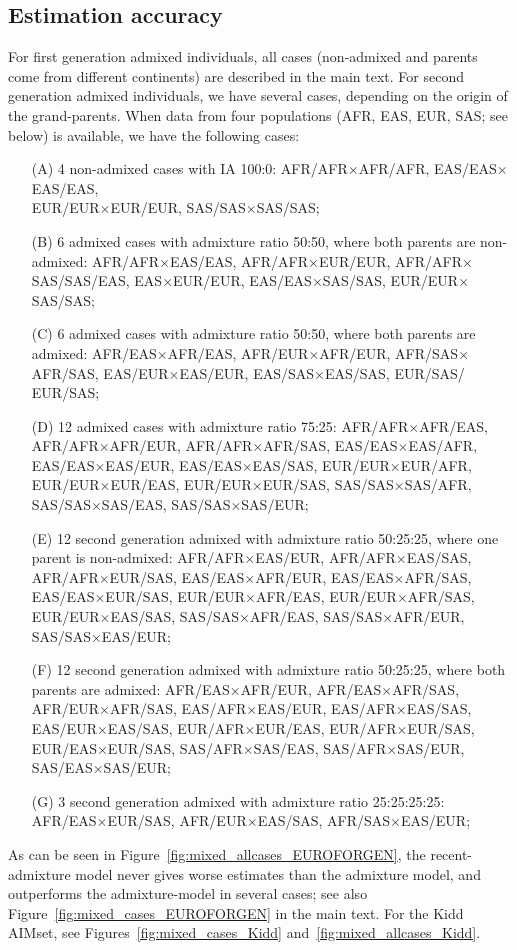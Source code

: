 \documentclass[12pt]{article}
\theoremstyle{definition}
\begin{document}
\newpage

\subsection{Estimation accuracy}
For first generation admixed individuals, all cases (non-admixed and
parents come from different continents) are described in the main
text. For second generation admixed individuals, we have several
cases, depending on the origin of the grand-parents.  When data from
four populations (AFR, EAS, EUR, SAS; see below) is available, we have
the following cases:
\begin{itemize}
\item[(A)] 4 non-admixed cases with IA 100:0: AFR/AFR$\times$AFR/AFR,
  EAS/EAS$\times$EAS/EAS, \\ EUR/EUR$\times$EUR/EUR,
  SAS/SAS$\times$SAS/SAS;
\item[(B)] 6 admixed cases with admixture ratio 50:50, where both
  parents are non-admixed: AFR/AFR$\times$EAS/EAS,
  AFR/AFR$\times$EUR/EUR, AFR/AFR$\times$SAS/SAS/EAS,
  EAS$\times$EUR/EUR, EAS/EAS$\times$SAS/SAS, EUR/EUR$\times$SAS/SAS;
\item[(C)] 6 admixed cases with admixture ratio 50:50, where both
  parents are admixed: AFR/EAS$\times$AFR/EAS, AFR/EUR$\times$AFR/EUR,
  AFR/SAS$\times$AFR/SAS, EAS/EUR$\times$EAS/EUR,
  EAS/SAS$\times$EAS/SAS, EUR/SAS/ EUR/SAS;
\item[(D)] 12 admixed cases with admixture ratio 75:25:
  AFR/AFR$\times$AFR/EAS, AFR/AFR$\times$AFR/EUR,
  AFR/AFR$\times$AFR/SAS, EAS/EAS$\times$EAS/AFR,
  EAS/EAS$\times$EAS/EUR, EAS/EAS$\times$EAS/SAS,
  EUR/EUR$\times$EUR/AFR, EUR/EUR$\times$EUR/EAS,
  EUR/EUR$\times$EUR/SAS, SAS/SAS$\times$SAS/AFR,
  SAS/SAS$\times$SAS/EAS, SAS/SAS$\times$SAS/EUR;
\item[(E)] 12 second generation admixed with admixture ratio 50:25:25,
  where one parent is non-admixed: AFR/AFR$\times$EAS/EUR,
  AFR/AFR$\times$EAS/SAS, AFR/AFR$\times$EUR/SAS,
  EAS/EAS$\times$AFR/EUR, EAS/EAS$\times$AFR/SAS,
  EAS/EAS$\times$EUR/SAS, EUR/EUR$\times$AFR/EAS,
  EUR/EUR$\times$AFR/SAS, EUR/EUR$\times$EAS/SAS,
  SAS/SAS$\times$AFR/EAS, SAS/SAS$\times$AFR/EUR,
  SAS/SAS$\times$EAS/EUR;
\item[(F)] 12 second generation admixed with admixture ratio 50:25:25,
  where both parents are admixed: AFR/EAS$\times$AFR/EUR,
  AFR/EAS$\times$AFR/SAS, AFR/EUR$\times$AFR/SAS,
  EAS/AFR$\times$EAS/EUR, EAS/AFR$\times$EAS/SAS,
  EAS/EUR$\times$EAS/SAS, EUR/AFR$\times$EUR/EAS,
  EUR/AFR$\times$EUR/SAS, EUR/EAS$\times$EUR/SAS,
  SAS/AFR$\times$SAS/EAS, SAS/AFR$\times$SAS/EUR,
  SAS/EAS$\times$SAS/EUR;
\item[(G)] 3 second generation admixed with admixture ratio
  25:25:25:25: AFR/EAS$\times$EUR/SAS, AFR/EUR$\times$EAS/SAS,
  AFR/SAS$\times$EAS/EUR;
\end{itemize}
As can be seen in Figure~\ref{fig:mixed_allcases_EUROFORGEN}, the
recent-admixture model never gives worse estimates than the admixture
model, and outperforms the admixture-model in several cases; see also
Figure~\ref{fig:mixed_cases_EUROFORGEN} in the main text.  For the
Kidd AIMset, see Figures~\ref{fig:mixed_cases_Kidd}
and~\ref{fig:mixed_allcases_Kidd}.
\end{document}
